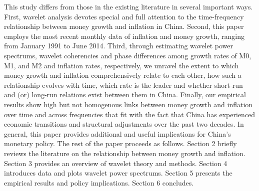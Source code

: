 \documentclass[a4paper,fleqn]{cas-sc}
\begin{document}
This study differs from those in the existing literature in several important ways. First, wavelet analysis devotes special and full attention to the time-frequency relationship between money growth and inflation in China. Second, this paper employs the most recent monthly data of inflation and money growth, ranging from January 1991 to June 2014. Third, through estimating wavelet power spectrums, wavelet coherencies and phase differences among growth rates of M0, M1, and M2 and inflation rates, respectively, we unravel the extent to which money growth and inflation comprehensively relate to each other, how such a relationship evolves with time, which rate is the leader and whether short-run and (or) long-run relations exist between them in China. Finally, our empirical results show high but not homogenous links between money growth and inflation over time and across frequencies that fit with the fact that China has experienced economic transitions and structural adjustments over the past two decades. In general, this paper provides additional and useful implications for China's monetary policy.
The rest of the paper proceeds as follows. Section 2 briefly reviews the literature on the relationship between money growth and inflation. Section 3 provides an overview of wavelet theory and methods. Section 4 introduces data and plots wavelet power spectrums. Section 5 presents the empirical results and policy implications. Section 6 concludes.
\end{document}
